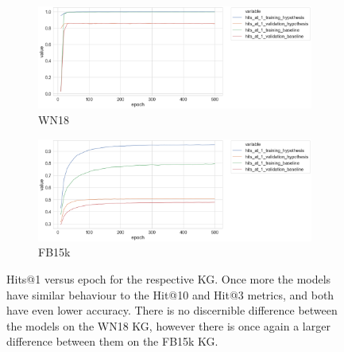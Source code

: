 
\begin{figure}
	\begin{subfigure}[b]{.5\linewidth}
   		\centering
    		\includegraphics[width=1.0\linewidth, height=0.6\linewidth]{WN18_hits_at_1_Results}
		\captionsetup{justification=centering}
		\caption{WN18}
	\end{subfigure}
	\begin{subfigure}[b]{.5\linewidth}
   		\centering
		\includegraphics[width=1.0\linewidth, height=0.6\linewidth]{FB15k_hits_at_1_Results}
		\captionsetup{justification=centering}
		\caption{FB15k}
	\end{subfigure}
	\caption{Hits@1 versus epoch for the respective KG. Once more the models have similar behaviour to the Hit@10 and Hit@3 metrics, and both have even lower accuracy. There is no discernible difference between the models on the WN18 KG, however there is once again a larger difference between them on the FB15k KG. }
\end{figure}


